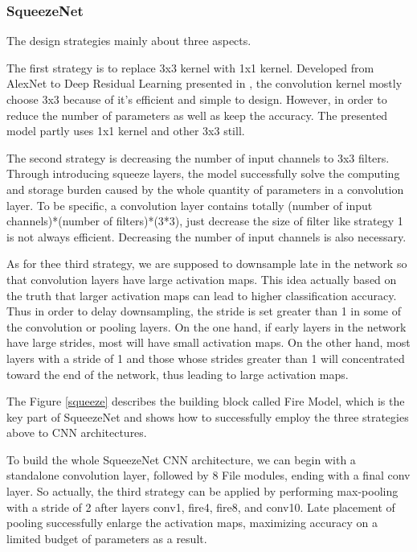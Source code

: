\documentclass[a4paper]{article}
\begin{document}
\subsubsection{SqueezeNet}
\par The design strategies mainly about three aspects.
\par The first strategy is to replace 3x3 kernel with 1x1 kernel. Developed from AlexNet to Deep Residual Learning presented in \cite{residual}, the convolution kernel mostly choose 3x3 because of it's efficient and simple to design. However, in order to reduce the number of parameters as well as keep the accuracy. The presented model partly uses 1x1 kernel and other 3x3 still.
\par The second strategy is decreasing the number of input channels to 3x3 filters. Through introducing squeeze layers, the model successfully solve the computing and storage burden caused by the whole quantity of parameters in a convolution layer. To be specific, a convolution layer contains totally (number of input channels)*(number of filters)*(3*3), just decrease the size of filter like strategy 1 is not always efficient. Decreasing the number of input channels is also necessary.
\par As for thee third strategy, we are supposed to downsample late in the network so that convolution layers have large activation maps. This idea actually based on the truth that larger activation maps can lead to higher classification accuracy. Thus in order to delay downsampling, the stride is set greater than 1 in some of the convolution or pooling layers. On the one hand, if early layers in the network have large strides, most will have small activation maps. On the other hand, most layers with a stride of 1 and those whose strides greater than 1 will concentrated toward the end of the network, thus leading to large activation maps.
\par The Figure \ref{squeeze} describes the building block called Fire Model, which is the key part of SqueezeNet and shows how to successfully employ the three strategies above to CNN architectures.
\par To build the whole SqueezeNet CNN architecture, we can begin with a standalone convolution layer, followed by 8 File modules, ending with a final conv layer. So actually, the third strategy can be applied by performing max-pooling with a stride of 2 after layers conv1, fire4, fire8, and conv10. Late placement of pooling successfully enlarge the activation maps, maximizing accuracy on a limited budget of parameters as a result.
\end{document}
